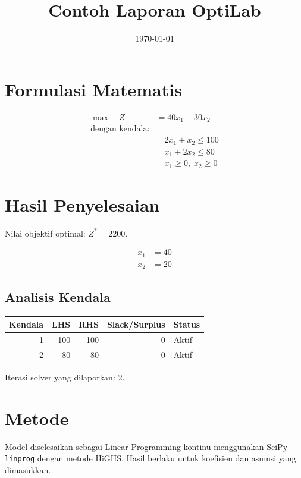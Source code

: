 \documentclass[11pt,a4paper]{article}
\title{Contoh Laporan OptiLab}
\date{\today}
\begin{document}
\maketitle
\section*{Formulasi Matematis}
\[\begin{aligned}
\max\quad Z &= 40x_{1} + 30x_{2} \\
\text{dengan kendala:} & \\
&\quad 2x_{1} + x_{2} \leq 100 \\
&\quad x_{1} + 2x_{2} \leq 80 \\
&\quad x_{1}\geq 0,\;x_{2}\geq 0
\end{aligned}\]
\section*{Hasil Penyelesaian}
Nilai objektif optimal: $Z^* = 2200$.

\[\begin{aligned}
x_{1} &= 40 \\
x_{2} &= 20
\end{aligned}\]
\subsection*{Analisis Kendala}
\begin{center}
\begin{tabular}{rrrrl}
\toprule Kendala & LHS & RHS & Slack/Surplus & Status \\
\midrule
1 & 100 & 100 & 0 & Aktif \\
2 & 80 & 80 & 0 & Aktif \\
\bottomrule
\end{tabular}
\end{center}
\noindent Iterasi solver yang dilaporkan: 2.
\section*{Metode}
Model diselesaikan sebagai Linear Programming kontinu menggunakan SciPy \texttt{linprog} dengan metode HiGHS. Hasil berlaku untuk koefisien dan asumsi yang dimasukkan.
\end{document}
